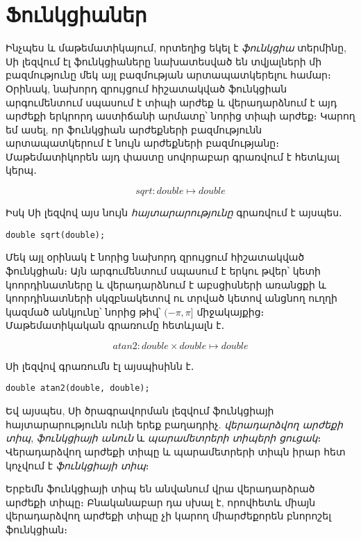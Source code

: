 \chapter{Ֆունկցիաներ}


Ինչպես և մաթեմատիկայում, որտեղից եկել է \emph{ֆունկցիա}
տերմինը, Սի լեզվում էլ ֆունկցիաները նախատեսված են տվյալների մի բազմությունը
մեկ այլ բազմության արտապատկերելու համար։ Օրինակ, նախորդ զրույցում հիշատակված
 ֆունկցիան արգումենտում սպասում է  տիպի
արժեք և վերադարձնում է այդ արժեքի երկրորդ աստիճանի արմատը՝ նորից 
տիպի արժեք։ Կարող եմ ասել, որ  ֆունկցիան  արժեքների
բազմությունն արտապատկերում է նույն  արժեքների բազմությանը։
Մաթեմատիկորեն այդ փաստը սովորաբար գրառվում է հետևյալ կերպ․

\[
sqrt : double \mapsto double
\]

Իսկ Սի լեզվով այս նույն \emph{հայտարարությունը} գրառվում է այսպես․

\begin{Verbatim}
double sqrt(double);
\end{Verbatim}

Մեկ այլ օրինակ է նորից նախորդ զրույցում հիշատակված 
ֆունկցիան։ Այն արգումենտում սպասում է երկու  թվեր՝ կետի
կոորդինատները և վերադարձնում է աբսցիսների առանցքի և կոորդինատների սկզբնակետով
ու տրված կետով անցնող ուղղի կազմած անկյունը՝ նորից  թիվ՝
\((−\pi, \pi]\) միջակայքից։ Մաթեմատիկական գրառումը հետևյալն է․

\[
atan2 : double \times double \mapsto double
\]

Սի լեզվով գրառումն էլ այսպիսինն է․

\begin{Verbatim}
double atan2(double, double);
\end{Verbatim}

Եվ այսպես, Սի ծրագրավորման լեզվում ֆունկցիայի հայտարարությունն ունի երեք
բաղադրիչ. \emph{վերադարձվող արժեքի տիպ}, \emph{ֆունկցիայի անուն} և
\emph{պարամետրերի տիպերի ցուցակ}։ Վերադարձվող արժեքի տիպը և պարամետրերի
տիպն իրար հետ կոչվում է \emph{ֆունկցիայի տիպ}։

Երբեմն ֆունկցիայի տիպ են անվանում վրա վերադարձրած արժեքի տիպը։ Բնականաբար
դա սխալ է, որովհետև միայն վերադարձվող արժեքի տիպը չի կարող միարժեքորեն
բնորոշել ֆունկցիան։

